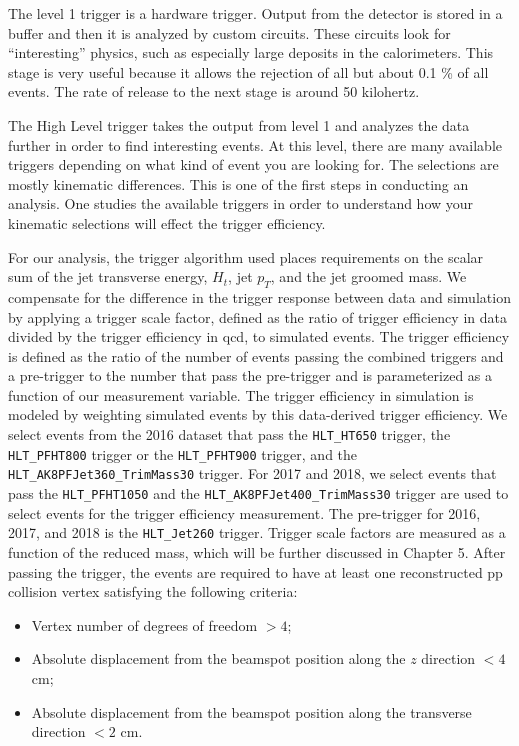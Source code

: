 The level 1 trigger is a hardware trigger. Output from the detector is stored in a buffer and then it is analyzed by custom circuits. 
These circuits look for ``interesting'' physics, such as especially large deposits in the calorimeters. 
This stage is very useful because it allows the rejection of all but about 0.1 \% of all events.
The rate of release to the next stage is around 50 kilohertz.

The High Level trigger takes the output from level 1 and analyzes the data further in order to find interesting events.
At this level, there are many available triggers depending on what kind of event you are looking for. The selections are mostly kinematic differences.
This is one of the first steps in conducting an analysis. One studies the available triggers in order to understand how your kinematic selections will effect the trigger efficiency.

For our analysis, the trigger algorithm used places requirements on the scalar sum of the jet transverse energy, $H_t$, jet $p_T$, and the jet groomed mass. 
We compensate for the difference in the trigger response between data and simulation by applying a trigger scale factor, defined as the ratio of trigger efficiency in data divided by the trigger efficiency in qcd, to simulated events. 
The trigger efficiency is defined as the ratio of the number of events passing the combined triggers and a pre-trigger to the number that pass the pre-trigger and is parameterized as a function of our measurement variable. 
The trigger efficiency in simulation is modeled by weighting simulated events by this data-derived trigger efficiency. 
We select events from the 2016 dataset that pass the \texttt{HLT\_HT650} trigger, the \texttt{HLT\_PFHT800} trigger or the \texttt{HLT\_PFHT900} trigger, and the \texttt{HLT\_AK8PFJet360\_TrimMass30} trigger. 
For 2017 and 2018, we select events that pass the \texttt{HLT\_PFHT1050} and the \texttt{HLT\_AK8PFJet400\_TrimMass30} trigger are used to select events for the trigger efficiency measurement. 
The pre-trigger for 2016, 2017, and 2018 is the \texttt{HLT\_Jet260} trigger.
Trigger scale factors are measured as a function of the reduced mass, which will be further discussed in Chapter 5. 
After passing the trigger, the events are required to have at least one reconstructed pp collision vertex satisfying the following criteria:
\begin{itemize}{}
\item Vertex number of degrees of freedom $> 4$;
\item Absolute displacement from the beamspot position along the $z$ direction $< 4$ cm;
\item Absolute displacement from the beamspot position along the transverse direction $< 2$ cm.
\end{itemize}

